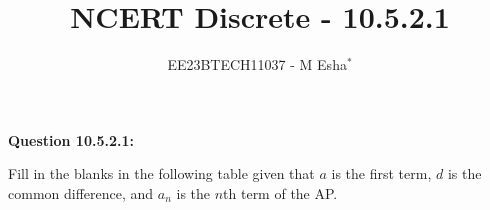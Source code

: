 \documentclass[journal,12pt,twocolumn]{IEEEtran}
\theoremstyle{remark}
\begin{document}

\vspace{3cm}

\title{NCERT Discrete - 10.5.2.1}
\author{EE23BTECH11037 - M Esha$^{*}$}

\maketitle
\newpage
\bigskip

\renewcommand{\thefigure}{\theenumi}
\renewcommand{\thetable}{\theenumi}

\vspace{3cm}
\textbf{Question 10.5.2.1:} 

 Fill in the blanks in the following table given that $a$ is the first term, $d$ is the common difference, and $a_n$ is the $n$th term of the AP.
\end{document}
